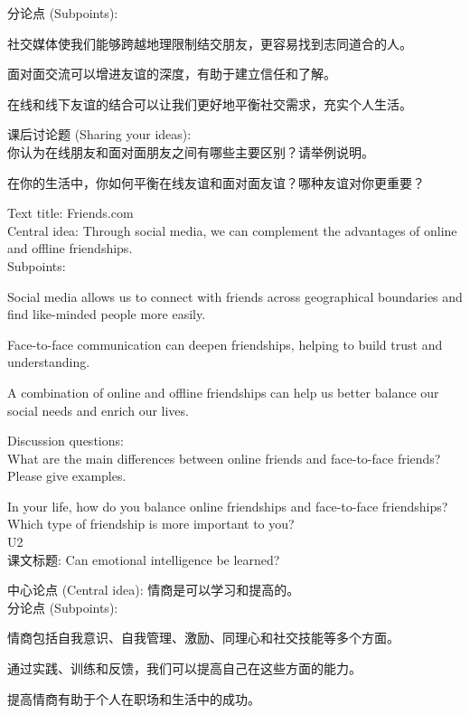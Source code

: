 \documentclass[a4paper,UTF8]{article}
\begin{document}
分论点 (Subpoints):

社交媒体使我们能够跨越地理限制结交朋友，更容易找到志同道合的人。

面对面交流可以增进友谊的深度，有助于建立信任和了解。

在线和线下友谊的结合可以让我们更好地平衡社交需求，充实个人生活。

课后讨论题 (Sharing your ideas):\\

你认为在线朋友和面对面朋友之间有哪些主要区别？请举例说明。

在你的生活中，你如何平衡在线友谊和面对面友谊？哪种友谊对你更重要？

Text title: Friends.com\\

Central idea: Through social media, we can complement the advantages of online and offline friendships.\\

Subpoints:

Social media allows us to connect with friends across geographical boundaries and find like-minded people more easily.

Face-to-face communication can deepen friendships, helping to build trust and understanding.

A combination of online and offline friendships can help us better balance our social needs and enrich our lives.

Discussion questions:\\

What are the main differences between online friends and face-to-face friends? Please give examples.

In your life, how do you balance online friendships and face-to-face friendships? Which type of friendship is more important to you?\\

U2\\

课文标题: Can emotional intelligence be learned?

中心论点 (Central idea): 情商是可以学习和提高的。\\

分论点 (Subpoints):

情商包括自我意识、自我管理、激励、同理心和社交技能等多个方面。

通过实践、训练和反馈，我们可以提高自己在这些方面的能力。

提高情商有助于个人在职场和生活中的成功。
\end{document}
